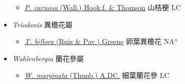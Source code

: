 \begin{itemize}
  \begin{itemize}
        \item[] \href{http://www.theplantlist.org/tpl1.1/search?q=Peracarpa+carnosa}{\textit{P. carnosa} (Wall.) Hook.f. \& Thomson}   山桔梗 LC
  \end{itemize}
 \item[] \textit{Triodanis} 異檐花屬
                    
  \begin{itemize}
        \item[] \href{http://www.theplantlist.org/tpl1.1/search?q=Triodanis+biflora}{\textit{T. biflora} (Ruiz \& Pav.) Greene}   卵葉異檐花 NA$^n$
  \end{itemize}
 \item[] \textit{Wahlenbergia} 蘭花參屬
                    
  \begin{itemize}
        \item[] \href{http://www.theplantlist.org/tpl1.1/search?q=Wahlenbergia+marginata}{\textit{W. marginata} (Thunb.) A.DC.}   細葉蘭花參 LC
  \end{itemize}
  \end{itemize}
